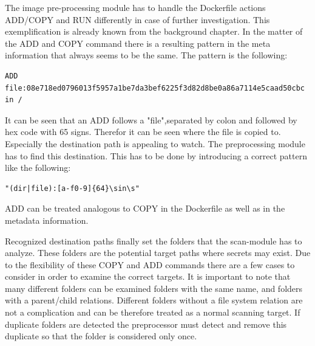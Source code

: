 The image pre-processing module has to handle the Dockerfile actions ADD/COPY and RUN differently in case of further investigation.
This exemplification is already known from the background chapter.
In the matter of the ADD and COPY command there is a resulting pattern in the meta information that always seems to be the same.
The pattern is the following:
\begin{lstlisting}
ADD file:08e718ed0796013f5957a1be7da3bef6225f3d82d8be0a86a7114e5caad50cbc in /
\end{lstlisting}
It can be seen that an ADD follows a "file",separated by colon and followed by hex code with 65 signs. Therefor it can be seen where the file is copied to.
Especially the destination path is appealing to watch. The preprocessing module has to find this destination. This has to be done by introducing a correct pattern like the following:
\begin{lstlisting}
"(dir|file):[a-f0-9]{64}\sin\s"
\end{lstlisting}
ADD can be treated analogous to COPY in the Dockerfile as well as in the metadata information.

Recognized destination paths finally set the folders that the scan-module has to analyze. These folders are the potential target paths where secrets may exist.
Due to the flexibility of these COPY and ADD commands there are a few cases to consider in order to examine the correct targets.
It is important to note that many different folders can be examined folders with the same name, and folders with a parent/child relations.
Different folders without a file system relation are not a complication and can be therefore treated as a normal scanning target. 
If duplicate folders are detected the preprocessor must detect and remove this duplicate so that the folder is considered only once.

